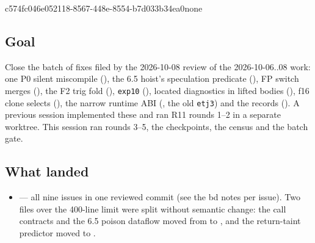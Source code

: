 %
  {c574fc04}{6e052118-8567-448e-8554-b7d033b34ea0}{none}

\subsection*{Goal}
Close the batch of fixes filed by the 2026-10-08 review of the 2026-10-06..08 work:
one P0 silent miscompile (), the 6.5 hoist's speculation predicate
(), FP switch merges (), the F2 trig fold (),
\texttt{exp10} (), located diagnostics in lifted bodies
(), f16 clone selects (), the narrow runtime ABI
(, the old \texttt{etj3}) and the records (). A previous
session implemented these and ran R11 rounds 1--2 in a separate worktree. This
session ran rounds 3--5, the checkpoints, the census and the batch gate.

\subsection*{What landed}
\begin{itemize}
\item {} --- all nine issues in one reviewed commit (see the bd
notes per issue). Two files over the 400-line limit were split without semantic
change: the call contracts and the 6.5 poison dataflow moved from
 to ,
and the return-taint predictor moved to .
\end{itemize}

